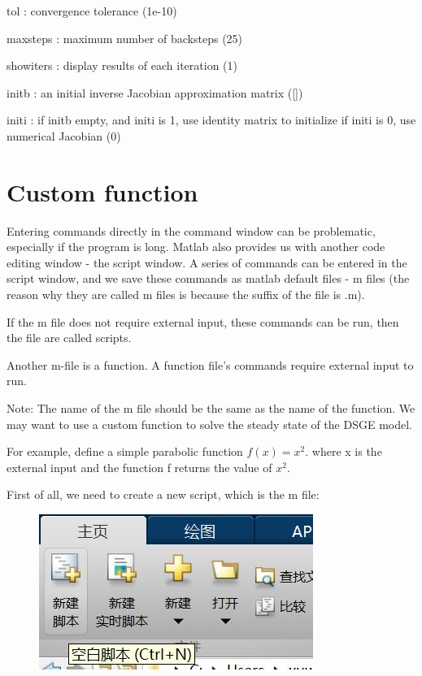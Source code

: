 \documentclass[10pt,math=newtx,citestyle=gb7714-2015,bibstyle=gb7714-2015]{elegantbook}
\begin{document}
{{{	tol       : convergence tolerance (1e-10)
	
	maxsteps  : maximum number of backsteps (25)
	
	showiters : display results of each iteration (1)
	
	initb     : an initial inverse Jacobian approximation matrix ([])
	
	initi     : if initb empty, and initi is 1, use identity matrix to initialize if initi is 0, use numerical Jacobian (0)
	
	\section{Custom function}
	
	Entering commands directly in the command window can be problematic, especially if the program is long. Matlab also provides us with another code editing window - the script window. A series of commands can be entered in the script window, and we save these commands as matlab default files - m files (the reason why they are called m files is because the suffix of the file is .m).
	
	If the m file does not require external input, these commands can be run, then the file are called scripts.
	
	Another m-file is a function. A function file's commands require external input to run.
	
	Note: The name of the m file should be the same as the name of the function. We may want to use a custom function to solve the steady state of the DSGE model.
	
	For example, define a simple parabolic function $f(x)=x^2$. where x is the external input and the function f returns the value of $x^2$.
	
	First of all, we need to create a new script, which is the m file:
	\begin{figure}[htbp!]
		\centering
		\includegraphics[width=0.8\linewidth]{FIG/newscript}
		\centering
	\end{figure}
	
}}}
\end{document}
